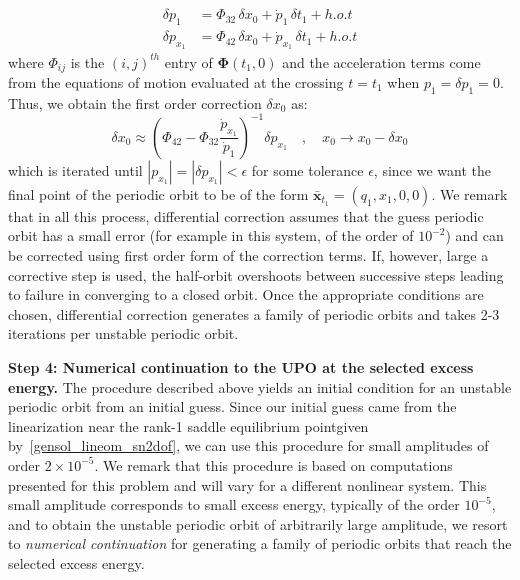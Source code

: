 \documentclass{ws-ijbc}
\begin{document}
\begin{align}
\delta p_{1} &= \Phi_{32} \, \delta x_0 + \dot{p}_{1} \, \delta t_1 + h.o.t \nonumber \\
\delta p_{x_1} &= \Phi_{42} \, \delta x_0 + \dot{p}_{x_1} \, \delta t_1 + h.o.t \nonumber
\end{align}
where $\Phi_{ij}$ is the $(i,j)^{th}$ entry of $\mathbf{\Phi}(t_1,0)$ and the acceleration terms come from the equations of motion evaluated at the crossing $t = t_1$ when $p_{1} = \delta p_{1} = 0$. Thus, we obtain the first order correction $\delta x_0$ as:
\begin{equation}
\delta x_0 \approx \left(\Phi_{42} - 
\Phi_{32}\frac{\dot{p}_{x_1}}{\dot{p}_{1}}\right)^{-1} \delta p_{x_1} \quad,\quad 
x_0 \rightarrow x_0 - \delta x_0 
\end{equation}
which is iterated until $|p_{x_1}| = |\delta p_{x_1}| < \epsilon$ for some tolerance $\epsilon$, since we want the final point of the periodic orbit to be of the form $\bar{\mathbf{x}}_{t_1} = (q_1,x_1,0,0)$. We remark that in all this process, differential correction assumes that the guess periodic orbit has a small error (for example in this system, of the order of $10^{-2}$) and can be corrected using first order form of the correction terms. If, however, large a corrective step is used, the half-orbit overshoots between successive steps leading to failure in converging to a closed orbit. Once the appropriate conditions are chosen, differential correction generates a family of periodic orbits and takes 2-3 iterations per unstable periodic orbit. 

\textbf{Step 4: Numerical continuation to the UPO at the selected excess energy.} The procedure described above yields an initial condition for an unstable periodic orbit from an initial guess. Since our initial guess came from the linearization near the rank-1 saddle equilibrium pointgiven by~\eqref{gensol_lineom_sn2dof}, we can use this procedure for small amplitudes of order $2 \times 10^{-5}$. We remark that this procedure is based on computations presented for this problem and will vary for a different nonlinear system. This small amplitude corresponds to small excess energy, typically of the order $10^{-5}$, and to obtain the unstable periodic orbit of arbitrarily large amplitude, we resort to {\it numerical continuation} for generating a family of periodic orbits that reach the selected excess energy. 
\end{document}
